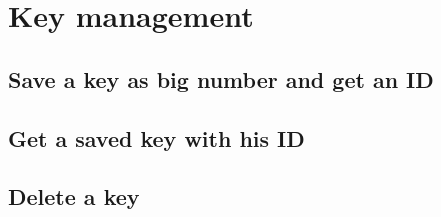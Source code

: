 \chapter{Key management}

\section{Save a key as big number and get an ID}

\section{Get a saved key with his ID}

\section{Delete a key}